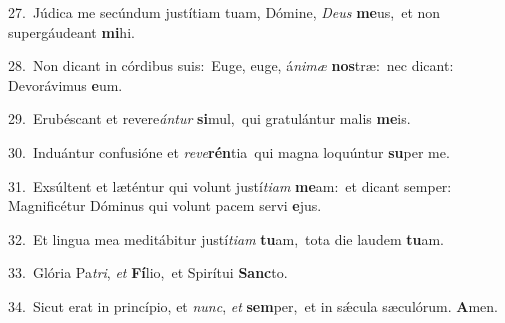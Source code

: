 {\numbfont\textcolor{\numbcolor}{27.}}~Júdica me secúndum justítiam tuam, Dómine, \textit{De}\-\textit{us} \textbf{me}\-us,~\star et non supergáudeant \textbf{mi}\-hi.\par
{\numbfont\textcolor{\numbcolor}{28.}}~Non dicant in córdibus suis:~\dagger Euge, euge, á\-\textit{ni}\-\textit{mæ} \textbf{nos}\-træ:~\star nec dicant: Devorávimus \textbf{e}\-um.\par
{\numbfont\textcolor{\numbcolor}{29.}}~Erubéscant et revere\-\textit{án}\-\textit{tur} \textbf{si}\-mul,~\star qui gratulántur malis \textbf{me}\-is.\par
{\numbfont\textcolor{\numbcolor}{30.}}~Induántur confusióne et \textit{re}\-\textit{ve}\textbf{rén}tia~\star qui magna loquúntur \textbf{su}\-per me.\par
{\numbfont\textcolor{\numbcolor}{31.}}~Exsúltent et læténtur qui volunt justí\-\textit{ti}\-\textit{am} \textbf{me}\-am:~\star et dicant semper: Magnificétur Dóminus qui volunt pacem servi \textbf{e}\-jus.\par
{\numbfont\textcolor{\numbcolor}{32.}}~Et lingua mea meditábitur justí\-\textit{ti}\-\textit{am} \textbf{tu}\-am,~\star tota die laudem \textbf{tu}\-am.\par
{\numbfont\textcolor{\numbcolor}{33.}}~Glória Pa\-\textit{tri}\-, \textit{et} \textbf{Fí}\-lio,~\star et Spirítui \textbf{Sanc}\-to.\par
{\numbfont\textcolor{\numbcolor}{34.}}~Sicut erat in princípio, et \textit{nunc}\-, \textit{et} \textbf{sem}\-per,~\star et in sǽcula sæculórum. \textbf{A}\-men.\par
